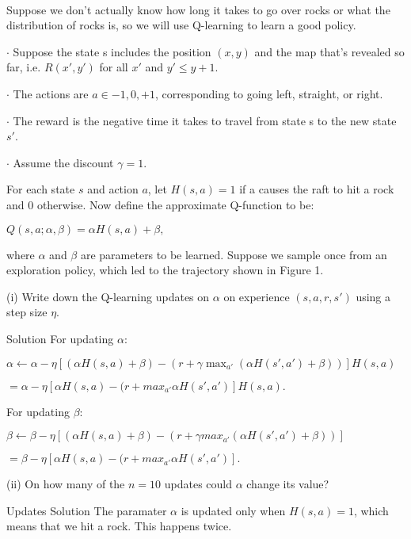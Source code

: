 \documentclass[4pt,landscape]{article}
\begin{document}
\begin{multicols*}{4}
\hrulefill\\
{\tiny Suppose we don’t actually know how long it takes to go over rocks or what the distribution
of rocks is, so we will use Q-learning to learn a good policy.}\par
{\tiny $\cdot$  Suppose the state s includes the position $(x, y)$ and the map that’s revealed so far, i.e. $R(x', y')$ for all $x'$ and $y' \le y + 1.$}\par
{\tiny $\cdot$  The actions are $a \in {−1, 0, +1}$, corresponding to going left, straight, or right.}\par
{\tiny $\cdot$  The reward is the negative time it takes to travel from state s to the new state $s'$.}\par
{\tiny $\cdot$  Assume the discount $\gamma = 1.$}\par
{\tiny For each state $s$ and action $a$, let $H(s, a) = 1$ if a causes the raft to hit a rock and 0
otherwise. Now define the approximate Q-function to be:}\par
{\tiny $Q(s, a; \alpha, \beta) = \alpha H(s, a) + \beta,$}\par
{\tiny where $\alpha$ and $\beta$ are parameters to be learned. Suppose we sample once from an exploration policy, which led to the trajectory shown in Figure 1.}\par
{\tiny (i) Write down the Q-learning updates on $\alpha$ on experience $(s, a, r, s')$ using a step size $\eta$.}\par
{\tiny {\color{purple}Solution} For updating $\alpha$:}\par
{\tiny $\alpha ← \alpha − \eta[(\alpha H(s, a) + \beta) − (r + \gamma \max_{a'}(\alpha H(s', a') + \beta))]H(s, a)$}\par
{\tiny $= \alpha − \eta[\alpha H(s, a) − (r + max_{a'}\alpha H(s', a')]H(s, a).$}\par
{\tiny For updating $\beta$:}\par
{\tiny $\beta ← \beta − \eta[(\alpha H(s, a) + \beta) − (r + \gamma max_{a'}(\alpha H(s', a') + \beta))]$}\par
{\tiny $= \beta − \eta[\alpha H(s, a) − (r + max_{a'}\alpha H(s', a')].$}\par
{\tiny (ii) On how many of the $n = 10$ updates could $\alpha$ change its value?}\par
{{\color{purple} Updates Solution} The paramater $\alpha$ is updated only when $H(s, a) = 1$, which means that we hit a rock. This happens twice.}\par


\end{multicols*}
\end{document}
